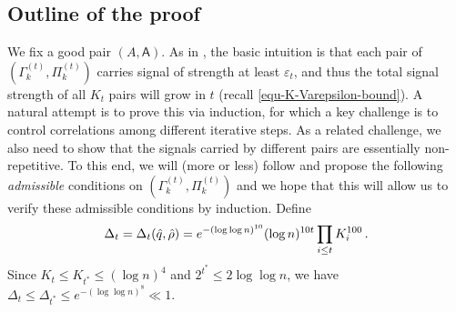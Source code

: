 \documentclass[11pt]{article}
\numberwithin{equation}{section}
\begin{document}
\subsection{Outline of the proof}
\label{sec:proof-outline}
We fix a good pair $(A, \mathsf A)$. As in \cite{DL22+}, the basic intuition is that each pair of $( \Gamma^{(t)}_k,\Pi^{(t)}_k)$ carries signal of strength at least $\varepsilon_t$, and thus the total signal strength of all $K_t$ pairs will grow in $t$ (recall \eqref{equ-K-Varepsilon-bound}). A natural attempt is to prove this via induction, for which a key challenge is to control correlations among different iterative steps. As a related challenge, we also need to show that the signals carried by different pairs are essentially non-repetitive. To this end, we will (more or less) follow \cite{DL22+} and propose the following \emph{admissible} conditions on $( \Gamma^{(t)}_k,\Pi^{(t)}_k)$ and we hope that this will allow us to verify these admissible conditions by induction. Define  
\begin{align}
    \Delta_t = \Delta_t(\Hat{q},\Hat{\rho}) = e^{ - (\log \log n)^{10} } (\log n)^{10t} \prod_{i \leq t} K_i^{100} \,.
    \label{equ-def-delta}
\end{align}
Since $K_t \leq K_{t^*} \leq (\log n)^4$ and $2^{t^*} \leq 2 \log \log n$, we have $\Delta_t \leq \Delta_{t^*} \leq e^{- (\log \log n)^8} \ll 1$.
\end{document}
